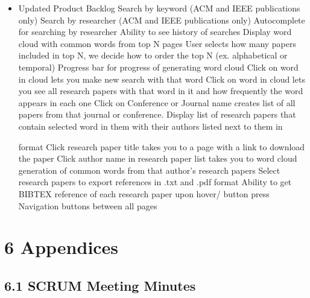 \documentclass[]{article}
\begin{document}
\begin{itemize}
\itemsep1pt\parskip0pt
\item
  Updated Product Backlog Search by keyword (ACM and IEEE publications
  only) Search by researcher (ACM and IEEE publications only)
  Autocomplete for searching by researcher Ability to see history of
  searches Display word cloud with common words from top N pages User
  selects how many papers included in top N, we decide how to order the
  top N (ex. alphabetical or temporal) Progress bar for progress of
  generating word cloud Click on word in cloud lets you make new search
  with that word Click on word in cloud lets you see all research papers
  with that word in it and how frequently the word appears in each one
  Click on Conference or Journal name creates list of all papers from
  that journal or conference. Display list of research papers that
  contain selected word in them with their authors listed next to them
  in

  format Click research paper title takes you to a page with a link to
  download the paper Click author name in research paper list takes you
  to word cloud generation of common words from that author's research
  papers Select research papers to export references in .txt and .pdf
  format Ability to get BIBTEX reference of each research paper upon
  hover/ button press Navigation buttons between all pages
\end{itemize}

\section{6 Appendices}\label{appendices}

\subsection{6.1 SCRUM Meeting Minutes}\label{scrum-meeting-minutes}
\end{document}
